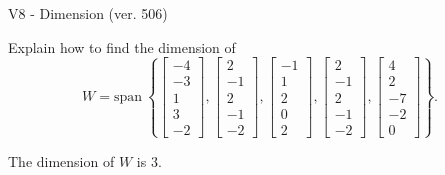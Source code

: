 \begin{exercise}
  \begin{exerciseTitle}V8 - Dimension (ver. 506)\end{exerciseTitle}
  \begin{exerciseStatement}
    Explain how to find the dimension of 
\[W=\mathrm{span}\ \left\{\left[\begin{array}{r}
-4 \\
-3 \\
1 \\
3 \\
-2
\end{array}\right] , \left[\begin{array}{r}
2 \\
-1 \\
2 \\
-1 \\
-2
\end{array}\right] , \left[\begin{array}{r}
-1 \\
1 \\
2 \\
0 \\
2
\end{array}\right] , \left[\begin{array}{r}
2 \\
-1 \\
2 \\
-1 \\
-2
\end{array}\right] , \left[\begin{array}{r}
4 \\
2 \\
-7 \\
-2 \\
0
\end{array}\right]\right\}.\]



  \end{exerciseStatement}
  \begin{exerciseAnswer}
   The dimension of \(W\) is  \(3\).
  


  \end{exerciseAnswer}
\end{exercise}
